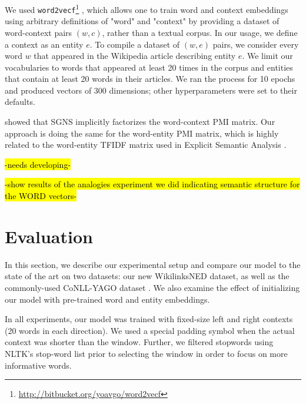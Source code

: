 \documentclass[11pt]{article}
\begin{document}
We used \texttt{word2vecf}\footnote{\url{http://bitbucket.org/yoavgo/word2vecf}} \cite{levy2014dependency}, which allows one to train word and context embeddings using arbitrary definitions of "word" and "context" by providing a dataset of word-context pairs $(w,c)$, rather than a textual corpus. In our usage, we define a context as an entity $e$. To compile a dataset of $(w,e)$ pairs, we consider every word $w$ that appeared in the Wikipedia article describing entity $e$. We limit our vocabularies to words that appeared at least 20 times in the corpus and entities that contain at least 20 words in their articles. We ran the process for 10 epochs and produced vectors of 300 dimensions; other hyperparameters were set to their defaults.

 showed that SGNS implicitly factorizes the word-context PMI matrix. Our approach is doing the same for the word-entity PMI matrix, which is highly related to the word-entity TFIDF matrix used in Explicit Semantic Analysis \cite{gabrilovich2007computing}.

\hl{-needs developing-}

\hl{-show results of the analogies experiment we did indicating semantic structure for the WORD vectors-}



\section{Evaluation}
\label{experiments}

In this section, we describe our experimental setup and compare our model to the state of the art on two datasets: our new WikilinksNED dataset, as well as the commonly-used CoNLL-YAGO dataset \cite{hoffart2011robust}. We also examine the effect of initializing our model with pre-trained word and entity embeddings.



In all experiments, our model was trained with fixed-size left and right contexts (20 words in each direction). We used a special padding symbol when the actual context was shorter than the window. Further, we filtered stopwords using NLTK's stop-word list prior to selecting the window in order to focus on more informative words.
\end{document}
